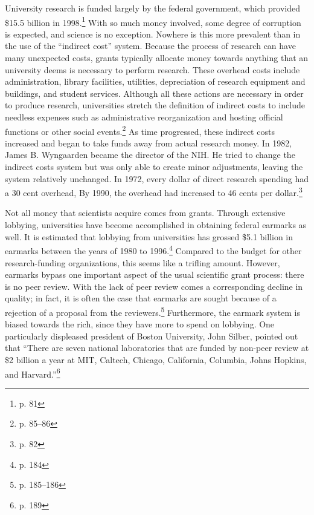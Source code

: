 \documentclass{article}[12pt]
\begin{document}
University research is funded largely by the federal government, which provided
\$15.5 billion in 1998.\footnote{p. 81} With so much money involved, some degree
of corruption is expected, and science is no exception.  Nowhere is this more
prevalent than in the use of the ``indirect cost'' system.  Because the process
of research can have many unexpected costs, grants typically allocate money
towards anything that an university deems is necessary to perform research.
These overhead costs include administration, library facilities, utilities,
depreciation of research equipment and buildings, and student services.
Although all these actions are necessary in order to produce research,
universities stretch the definition of indirect costs to include needless
expenses such as administrative reorganization and hosting official functions
or other social events.\footnote{p. 85--86}  As time progressed, these indirect
costs increased and began to take funds away from actual research money.  In
1982, James B. Wyngaarden became the director of the NIH.  He tried to change
the indirect costs system but was only able to create minor adjustments,
leaving the system relatively unchanged.  In 1972, every dollar of direct
research spending had a 30 cent overhead,  By 1990, the overhead had increased
to 46 cents per dollar.\footnote{p. 82}  

Not all money that scientists acquire comes from grants. Through extensive
lobbying, universities have become accomplished in obtaining federal earmarks
as well. It is estimated that lobbying from universities has grossed \$5.1
billion in earmarks between the years of 1980 to 1996.\footnote{p. 184} Compared
to the budget for other research-funding organizations, this seems like a
trifling amount. However, earmarks bypass one important aspect of the usual
scientific grant process: there is no peer review. With the lack of peer review
comes a corresponding decline in quality; in fact, it is often the case that
earmarks are sought because of a rejection of a proposal from the
reviewers.\footnote{p. 185--186} Furthermore, the earmark system is biased
towards the rich, since they have more to spend on lobbying. One particularly
displeased president of Boston University, John Silber, pointed out that
``There are seven national laboratories that are funded by non-peer review at
\$2 billion a year at MIT, Caltech, Chicago, California, Columbia, Johns
Hopkins, and Harvard.''\footnote{p. 189}
\end{document}
